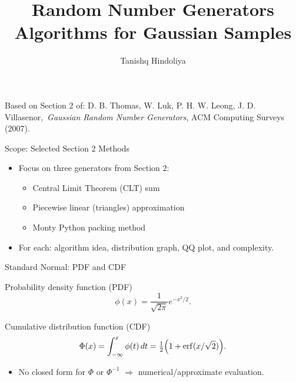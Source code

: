 \documentclass[aspectratio=169]{beamer}
\title[GRNG Algorithms (Sec. 2)]{Random Number Generators\\\large Algorithms for Gaussian Samples}
\author{Tanishq Hindoliya}
\institute{Indian Statistical Institute Bangalore}
\date{}
\begin{document}
\begin{frame}
  \titlepage
  \vspace{-0.5em}
  \small
  Based on Section 2 of: D. B. Thomas, W. Luk, P. H. W. Leong, J. D. Villasenor,\
  \textit{Gaussian Random Number Generators}, ACM Computing Surveys (2007).
\end{frame}

\begin{frame}{Scope: Selected Section 2 Methods}
\begin{itemize}
  \item Focus on three generators from Section 2:
  \begin{itemize}
    \item Central Limit Theorem (CLT) sum
    \item Piecewise linear (triangles) approximation
    \item Monty Python packing method
  \end{itemize}
  \item For each: algorithm idea, distribution graph, QQ plot, and complexity.
\end{itemize}
\end{frame}

\begin{frame}{Standard Normal: PDF and CDF}
\small
\begin{block}{Probability density function (PDF)}
\[
\phi(x) = \frac{1}{\sqrt{2\pi}} e^{-x^2/2}.
\]
\end{block}
\begin{block}{Cumulative distribution function (CDF)}
\[
\Phi(x) = \int_{-\infty}^{x} \phi(t)\,dt = \tfrac{1}{2}\Bigl(1 + \mathrm{erf}(x/\sqrt{2})\Bigr).
\]
\end{block}
\begin{itemize}
  \item No closed form for $\Phi$ or $\Phi^{-1}$ \(\Rightarrow\) numerical/approximate evaluation.
\end{itemize}
\end{frame}
\end{document}
